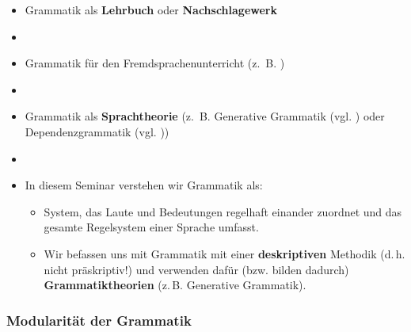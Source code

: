 
\begin{frame}

\begin{itemize}
	\item<1-> Grammatik als \textbf{Lehrbuch} oder \textbf{Nachschlagewerk}
	\item[]
	\item<2-> Grammatik für den Fremdsprachenunterricht (z.~B. \citet{Helbig&Buscha05a})
	\item[]
	\item<3-> Grammatik als \textbf{Sprachtheorie} (z.~B. Generative Grammatik (vgl. \citet{Philippi&Tewes10a}) oder Dependenzgrammatik (vgl. \citet{Agel00a}))
	\item[]
	\item<4-> In diesem Seminar verstehen wir Grammatik als:

	\begin{itemize}
		\item<4-> System, das Laute und Bedeutungen regelhaft einander zuordnet und das gesamte Regelsystem einer Sprache umfasst.
		\item<4-> Wir befassen uns mit Grammatik mit einer \textbf{deskriptiven} Methodik (d.\,h. nicht präskriptiv!) und verwenden dafür (bzw. bilden dadurch) \textbf{Grammatiktheorien} (z.\,B. Generative Grammatik).
	\end{itemize}

\end{itemize}

\end{frame}


%
\subsubsection{Modularität der Grammatik}

